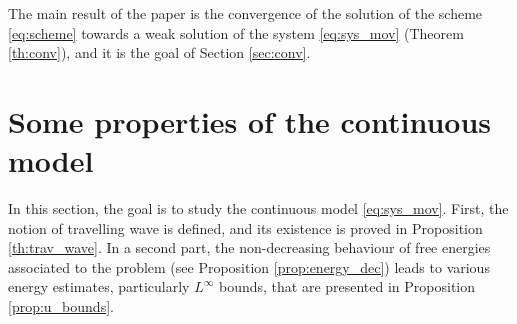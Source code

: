 \documentclass{amsart}
\begin{document}
The main result of the paper is the convergence of the solution of the scheme \eqref{eq:scheme} towards a weak solution of the system \eqref{eq:sys_mov} (Theorem \ref{th:conv}), and it is the goal of Section \ref{sec:conv}.
\section{Some properties of the continuous model}

\indent

In this section, the goal is to study the continuous model \eqref{eq:sys_mov}. First, the notion of travelling wave is defined, and its existence is proved in Proposition \ref{th:trav_wave}. In a second part, the non-decreasing behaviour of free energies associated to the problem (see Proposition \ref{prop:energy_dec}) leads to various energy estimates, particularly $L^\infty$ bounds, that are presented in Proposition \ref{prop:u_bounds}.
\end{document}
